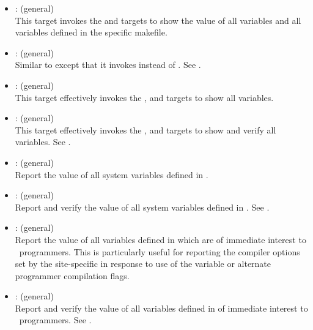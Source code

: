 \begin{itemize}
\item
    : (general)
   \\ This target invokes the  and 
   targets to show the value of all  variables and all
   variables defined in the specific makefile.

\item
    : (general)
   \\ Similar to  except that it invokes 
   instead of .  See .

\item
     : (general)
   \\ This target effectively invokes the , 
   and  targets to show all  variables.

\item
     : (general)
   \\ This target effectively invokes the , 
   and  targets to show and verify all 
   variables.  See .

\item
     : (general)
   \\ Report the value of all system variables defined in .

\item
     : (general)
   \\ Report and verify the value of all system variables defined in
   .  See .

\item
    : (general)
   \\ Report the value of all variables defined in  which are
   of immediate interest to \aipspp\ programmers.  This is particularly useful
   for reporting the compiler options set by the site-specific
    in response to use of the  variable or
   alternate programmer compilation flags.

\item
    : (general)
   \\ Report and verify the value of all variables defined in 
   of immediate interest to \aipspp\ programmers.  See .


\end{itemize}

